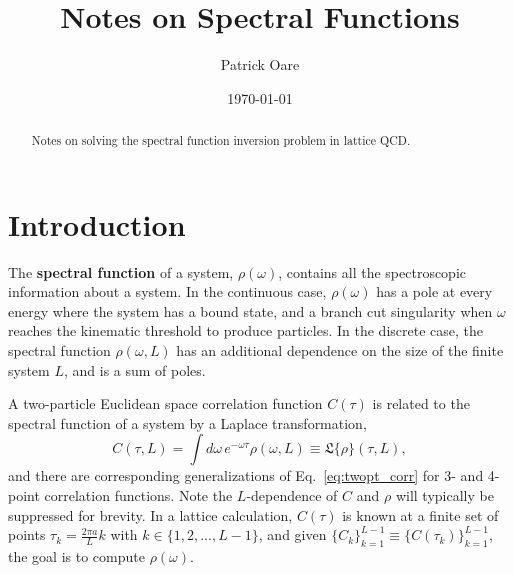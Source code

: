 \def \root {../../..}			%


\usepackage[toc,page]{appendix}
\usepackage{listings}

\newcommand{\poarecomment}[1]{\textcolor{red}{#1}}


\usepackage[numbers,sort&compress]{natbib}

\renewcommand{\im}{\mathrm{Im}}
\newcommand{\re}{\mathrm{Re}}
\newcommand{\esssup}{\mathrm{ess}\,\mathrm{sup}}



\title{Notes on Spectral Functions}
\author{Patrick Oare}

\date{\today}

\maketitle

\begin{abstract}
Notes on solving the spectral function inversion problem in lattice QCD.
\end{abstract}

\section{Introduction}

The \textbf{spectral function} of a system, $\rho(\omega)$, contains all the spectroscopic information about a system. In the continuous case, $\rho(\omega)$ has a pole at every energy where the system has a bound state, and a branch cut singularity when $\omega$ reaches the kinematic threshold to produce particles. In the discrete case, the spectral function $\rho(\omega, L)$ has an additional dependence on the size of the finite system $L$, and is a sum of poles. 

A two-particle Euclidean space correlation function $C(\tau)$ is related to the spectral function of a system by a Laplace transformation,
\begin{equation}
    C(\tau, L) = \int d\omega\, e^{-\omega\tau} \rho(\omega, L) \equiv \mathfrak L \{\rho\}(\tau, L), 
    \label{eq:twopt_corr}
\end{equation}
and there are corresponding generalizations of Eq.~\eqref{eq:twopt_corr} for 3- and 4-point correlation functions. Note the $L$-dependence of $C$ and $\rho$ will typically be suppressed for brevity. In a lattice calculation, $C(\tau)$ is known at a finite set of points $\tau_k = \frac{2\pi a}{L} k$ with $k\in \{1, 2, ..., L - 1\}$, and given $\{C_k\}_{k = 1}^{L - 1}\equiv \{C(\tau_k)\}_{k = 1}^{L - 1}$, the goal is to compute $\rho(\omega)$. 

